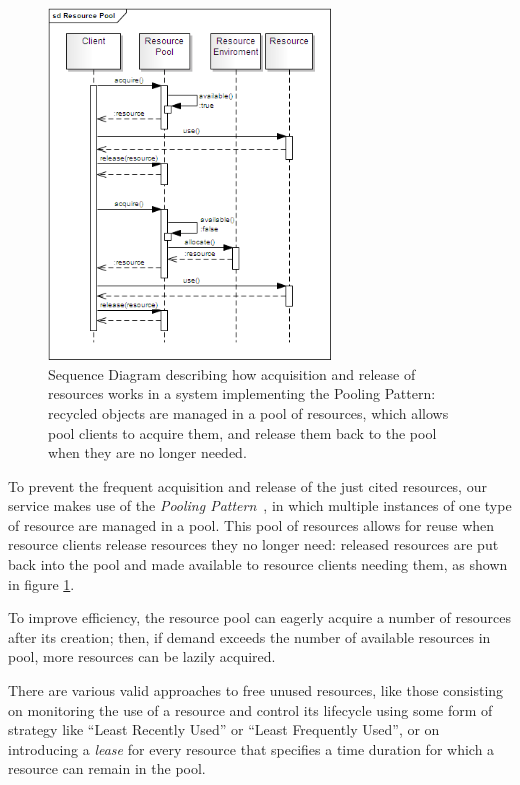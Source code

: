 \documentclass[11pt]{article}
\begin{document}
\begin{figure}[!ht]
\begin{center}
\includegraphics[width=7.5cm]{resource_pool}
\end{center}
\caption{Sequence Diagram describing how acquisition and release of resources works in a system implementing the Pooling Pattern: recycled objects are
managed in a pool of resources, which allows pool clients to acquire them, and release them back to the pool when they are no longer needed.}
\label{fig:rp}
\end{figure}

To prevent the frequent acquisition and release of the just cited resources, our service makes use of the \emph{Pooling Pattern}~\citep{kircher2001}, 
in which multiple instances of one type of resource are managed in a pool.  This pool of resources allows for reuse when resource clients release resources
they no longer need: released resources are put back into the pool and made available to resource clients needing them, as shown in figure \ref{fig:rp}.

To improve efficiency, the resource pool can eagerly acquire a number of resources after its creation; then, if demand exceeds the number of available resources in
pool, more resources can be lazily acquired.

There are various valid approaches to free unused resources, like those consisting on monitoring the use of a resource and control its lifecycle using some form of 
strategy like ``Least Recently Used'' or ``Least Frequently Used'', or on introducing a \emph{lease} for every resource that specifies a time duration for which
a resource can remain in the pool.
\end{document}
